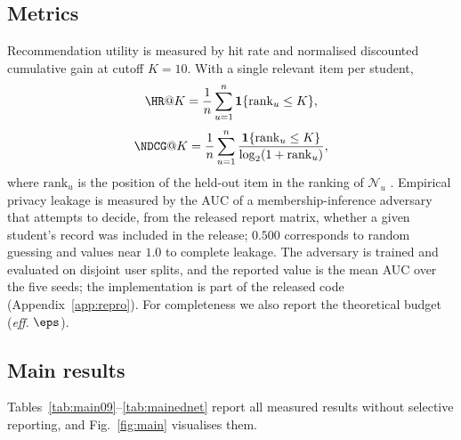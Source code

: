 \subsection{Metrics}\label{sec:metrics}

Recommendation utility is measured by hit rate and normalised discounted cumulative gain at cutoff $K=10$. With a single relevant item per student,
\begin{equation}\label{eq:hr}
\HR@K=\frac{1}{n}\sum_{u=1}^{n}\mathbf 1\{\mathrm{rank}_u\le K\},
\end{equation}
\begin{equation}\label{eq:ndcg}
\NDCG@K=\frac{1}{n}\sum_{u=1}^{n}\frac{\mathbf 1\{\mathrm{rank}_u\le K\}}{\log_2(1+\mathrm{rank}_u)},
\end{equation}
where $\mathrm{rank}_u$ is the position of the held-out item in the ranking of $\mathcal{N}_u$ \cite{jarvelin2002cg}. Empirical privacy leakage is measured by the AUC of a membership-inference adversary that attempts to decide, from the released report matrix, whether a given student's record was included in the release; $0.500$ corresponds to random guessing and values near $1.0$ to complete leakage. The adversary is trained and evaluated on disjoint user splits, and the reported value is the mean AUC over the five seeds; the implementation is part of the released code (Appendix~\ref{app:repro}). For completeness we also report the theoretical budget (\emph{eff.} $\eps$).

\subsection{Main results}\label{sec:main}

Tables~\ref{tab:main09}--\ref{tab:mainednet} report all measured results without selective reporting, and Fig.~\ref{fig:main} visualises them.

